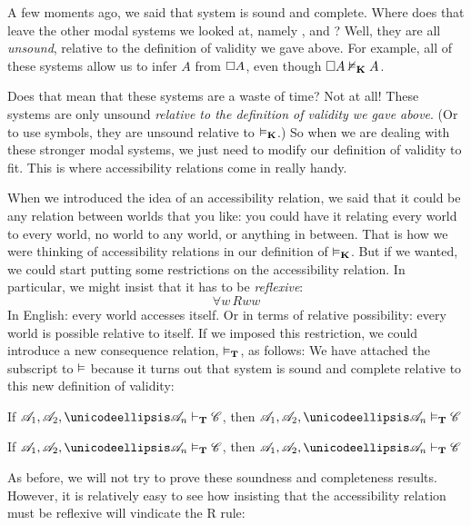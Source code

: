 A few moments ago, we said that system \mlK{} is sound and complete. Where does that leave the other modal systems we looked at, namely  \mlT, \mlSfour{} and \mlSfive? Well, they are all \emph{unsound}, relative to the definition of validity we gave above. For example, all of these systems allow us to infer $A$ from $\Box A$, even though $\Box A\nvDash_{\mathbf{K}} A$.

Does that mean that these systems are a waste of time? Not at all! These systems are only unsound \emph{relative to the definition of validity we gave above}. (Or to use symbols, they are unsound relative to $\vDash_{\mathbf{K}}$.) So when we are dealing with these stronger modal systems, we just need to modify our definition of validity to fit. This is where accessibility relations come in really handy.

When we introduced the idea of an accessibility relation, we said that it could be any relation between worlds that you like: you could have it relating every world to every world, no world to any world, or anything in between. That is how we were thinking of accessibility relations in our definition of $\vDash_{\mathbf{K}}$. But if we wanted, we could start putting some restrictions on the accessibility relation. In particular, we might insist that it has to be \emph{reflexive}:
\[\forall w\, Rww\]
In English: every world accesses itself. Or in terms of relative possibility: every world is possible relative to itself. If we imposed this restriction, we could introduce a new consequence relation, $\vDash_{\mathbf{T}}$, as follows:
We have attached the \mlT{} subscript to $\vDash$ because it turns out that system \mlT{} is sound and complete relative to this new definition of validity:
\begin{compactlist}
	\item If $\metav{A}_1,\metav{A}_2, \dots \metav{A}_n\proves_\mlT\metav{C}$, then $\metav{A}_1,\metav{A}_2, \dots \metav{A}_n\entails_\mlT\metav{C}$
	\item If $\metav{A}_1,\metav{A}_2, \dots \metav{A}_n\entails_\mlT\metav{C}$, then $\metav{A}_1,\metav{A}_2, \dots \metav{A}_n\proves_\mlT\metav{C}$
\end{compactlist}
As before, we will not try to prove these soundness and completeness results. However, it is relatively easy to see how insisting that the accessibility relation must be reflexive will vindicate the R\mlT{} rule:
